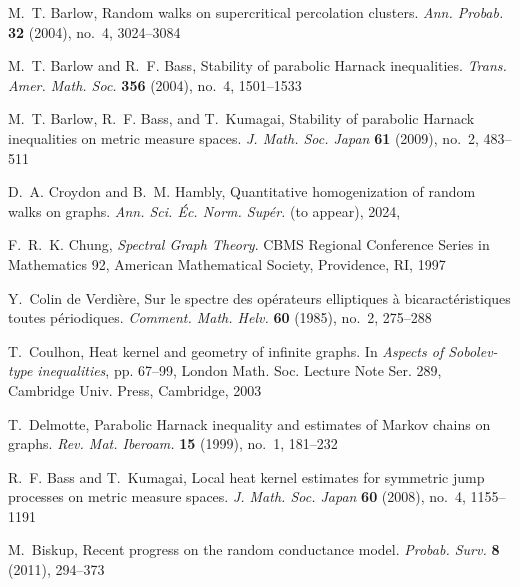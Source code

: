 \documentclass{article}
\numberwithin{equation}{section}
\theoremstyle{definition}
\theoremstyle{remark}
\begin{document}


\begin{thebibliography}{99}

M.~T. Barlow, Random walks on supercritical percolation clusters.
\emph{Ann. Probab.} \textbf{32} (2004), no.~4, 3024--3084

M.~T. Barlow and R.~F. Bass, Stability of parabolic Harnack inequalities.
\emph{Trans. Amer. Math. Soc.} \textbf{356} (2004), no.~4, 1501--1533

M.~T. Barlow, R.~F. Bass, and T.~Kumagai, Stability of parabolic Harnack inequalities on metric measure spaces.
\emph{J. Math. Soc. Japan} \textbf{61} (2009), no.~2, 483--511

D.~A. Croydon and B.~M. Hambly, Quantitative homogenization of random walks on graphs.
\emph{Ann. Sci. Éc. Norm. Supér.} (to appear), 2024, 

F.~R.~K. Chung, \emph{Spectral Graph Theory}.
CBMS Regional Conference Series in Mathematics 92, American Mathematical Society, Providence, RI, 1997

Y.~Colin de Verdière, Sur le spectre des opérateurs elliptiques à bicaractéristiques toutes périodiques.
\emph{Comment. Math. Helv.} \textbf{60} (1985), no.~2, 275--288

T.~Coulhon, Heat kernel and geometry of infinite graphs.
In \emph{Aspects of Sobolev-type inequalities},
pp. 67--99, London Math. Soc. Lecture Note Ser. 289,
Cambridge Univ. Press, Cambridge, 2003

T.~Delmotte, Parabolic Harnack inequality and estimates of Markov chains on graphs.
\emph{Rev. Mat. Iberoam.} \textbf{15} (1999), no.~1, 181--232

R.~F. Bass and T.~Kumagai, Local heat kernel estimates for symmetric jump processes on metric measure spaces.
\emph{J. Math. Soc. Japan} \textbf{60} (2008), no.~4, 1155--1191

M.~Biskup, Recent progress on the random conductance model.
\emph{Probab. Surv.} \textbf{8} (2011), 294--373


\end{thebibliography}
\end{document}
